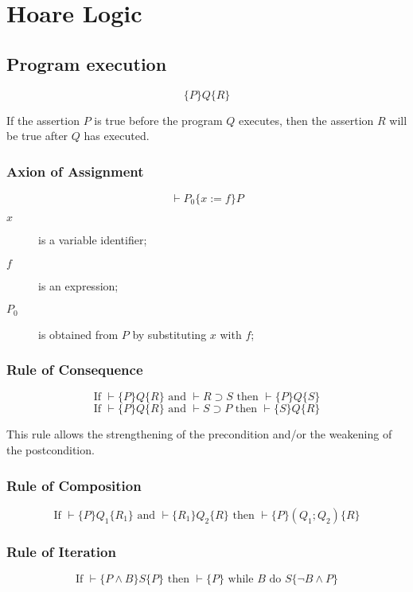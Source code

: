 
\chapter{Hoare Logic} %

\label{AppendixC}

\section{Program execution}
\[
	\{P\}Q\{R\}
\]

If the assertion \(P\) is true before the program \(Q\) executes, then the assertion \(R\) will be true after \(Q\) has executed.

\subsection{Axion of Assignment}

\[
	\vdash P_0 \{ x := f \} P
\]

\begin{description}
    \item [\(x\)] is a variable identifier;
    \item [\(f\)] is an expression;
    \item [\(P_0\)] is obtained from \(P\) by substituting \(x\) with \(f\);
\end{description}

\subsection{Rule of Consequence}
\[
	\textrm{If } \vdash \{P\}Q\{R\} \textrm{ and } \vdash R \supset S \textrm{ then } \vdash \{P\}Q\{S\}
\]
\[
	\textrm{If } \vdash \{P\}Q\{R\} \textrm{ and } \vdash S \supset P \textrm{ then } \vdash \{S\}Q\{R\}
\]

This rule allows the strengthening of the precondition and/or the weakening of the postcondition. 

\subsection{Rule of Composition}
\[
	\textrm{If } \vdash \{P\}Q_1\{R_1\} \textrm{ and } \vdash \{R_1\}Q_2\{R\} \textrm{ then } \vdash \{P\}(Q_1; Q_2)\{R\}
\]

\subsection{Rule of Iteration}
\[
	\textrm{If } \vdash \{P \land B\}S\{P\} \textrm{ then } \vdash \{P\}\textrm{ while } B \textrm{ do } S\{\lnot B \land P\}
\]